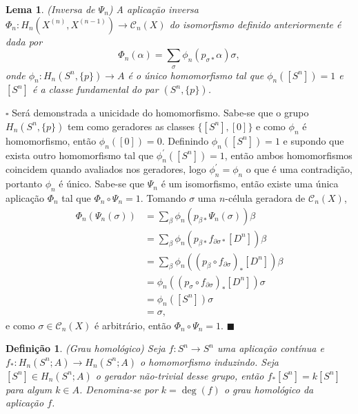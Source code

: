 \documentclass[12pt]{book}
\newtheorem{lema}[teorema]{Lema}
\newtheorem{definicao}[teorema]{Definição}
\newenvironment{prova}[1]{$\square$ #1}{\hfill$\blacksquare$}
\newcommand{\homologia}[2]{H_{#1}(#2;A)}
\newcommand{\homologiarel}[3]{H_{#1}(#2,#3)}
\newcommand{\homologiarelskelesimpl}[2]{H_{#1}(X^{(#2)}, X^{(#2-1)})}
\begin{document}
	\begin{lema}
		(Inversa de $\Psi_{n}$) A aplicação inversa $\Phi_{n} : \homologiarelskelesimpl{n}{n} \to \mathcal{C}_{n}(X)$ do isomorfismo definido anteriormente é dada por
		$$
		\Phi_{n}(\alpha) = \sum_{\sigma} \phi_{n}(p_{\sigma *}\alpha)\sigma,
		$$
		onde $\phi_{n}: \homologiarel{n}{S^{n}}{\{p\}} \to A$ é o único homomorfismo tal que $\phi_{n}([S^{n}])=1$ e $[S^{n}]$ é a classe fundamental do par $(S^{n}, \{p\})$.
	\end{lema}
	\begin{prova}
		Será demonstrada a unicidade do homomorfismo. Sabe-se que o grupo $\homologiarel{n}{S^{n}}{\{p\}}$ tem como geradores as classes $\{[S^{n}], [0]\}$ e como $\phi_{n}$ é homomorfismo, então $\phi_{n}([0]) = 0$. Definindo $\phi_{n}([S^{n}]) = 1$ e supondo que exista outro homomorfismo tal que $\phi_{n}^{'} ([S^{n}]) = 1$, então ambos homomorfismos coincidem quando avaliados nos geradores, logo $\phi_{n}^{'}=\phi_{n}$ o que é uma contradição, portanto $\phi_{n}$ é único. Sabe-se que $\Psi_{n}$ é um isomorfismo, então existe uma única aplicação $\Phi_{n}$ tal que $\Phi_{n} \circ \Psi_{n} = 1$. Tomando $\sigma$ uma $n$-célula geradora de $\mathcal{C}_{n}(X)$,
		$$
		\begin{aligned}
		\Phi_{n}(\Psi_{n}(\sigma)) 
		&= \sum_{\beta}\phi_{n}(p_{\beta *}\Psi_{n}(\sigma))\beta
		\\
		&= \sum_{\beta}\phi_{n}(p_{\beta *}f_{\partial\sigma *}[D^{n}])\beta
		\\
		&= \sum_{\beta}\phi_{n}((p_{\beta}\circ f_{\partial\sigma})_{*}[D^{n}])\beta
		\\
		&= \phi_{n}((p_{\sigma}\circ f_{\partial\sigma})_{*}[D^{n}])\sigma
		\\
		&= \phi_{n}([S^{n}])\sigma
		\\
		&= \sigma,
		\end{aligned}
		$$
		e como $\sigma \in \mathcal{C}_{n}(X)$ é arbitrário, então $\Phi_{n} \circ \Psi_{n} = 1$.
	\end{prova}
	
	\begin{definicao}
		(Grau homológico) Seja $f: S^{n} \to S^{n}$ uma aplicação contínua e $f_{*}: \homologia{n}{S^{n}} \to \homologia{n}{S^{n}}$ o homomorfismo induzindo. Seja $[S^{n}] \in \homologia{n}{S^{n}}$ o gerador não-trivial desse grupo, então $f_{*}[S^{n}] = k[S^{n}]$ para algum $k \in A$. Denomina-se por $k=\deg(f)$ o grau homológico da aplicação $f$.
	\end{definicao}
	
\end{document}
